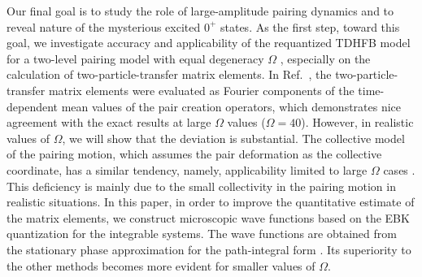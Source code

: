 \documentclass[%
superscriptaddress,
preprint,
showpacs,
nofootinbib,
amsmath,amssymb,
aps,
prc,
floatfix ]%
{revtex4-1}
\begin{document}
Our final goal is to study the role of large-amplitude pairing dynamics
and to reveal nature of the mysterious excited $0^+$ states.
As the first step, toward this goal, we investigate accuracy and
applicability of the requantized TDHFB model for a two-level pairing model
with equal degeneracy $\Omega$ \cite{HF60},
especially on the calculation of two-particle-transfer matrix elements.
In Ref.~\cite{CDS84},
the two-particle-transfer matrix elements were evaluated as
Fourier components of the time-dependent mean values of the pair
creation operators,
which demonstrates nice agreement with the exact results at
large $\Omega$ values ($\Omega=40$).
However, in realistic values of $\Omega$, we will show that
the deviation is substantial.
The collective model of the pairing motion, which assumes the pair deformation
as the collective coordinate, has a similar tendency, namely, 
applicability limited to large $\Omega$ cases \cite{BBPK70}.
This deficiency is mainly due to the small collectivity in the pairing motion
in realistic situations.
In this paper, in order to improve the quantitative estimate of the matrix
elements, we construct microscopic wave functions
based on the EBK quantization for the integrable systems.
The wave functions are obtained
from the stationary phase approximation for the path-integral form \cite{SM88}.
Its superiority to the other methods
becomes more evident for smaller values of $\Omega$.

\end{document}
